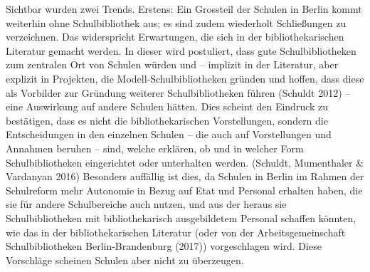 \documentclass[a4paper,
fontsize=11pt,
oneside,
numbers=noperiodatend,
parskip=half-,
bibliography=totoc,
final
]{scrartcl}
\begin{document}
Sichtbar wurden zwei Trends. Erstens: Ein Grossteil der Schulen in
Berlin kommt weiterhin ohne Schulbibliothek aus; es sind zudem
wiederholt Schließungen zu verzeichnen. Das widerspricht Erwartungen,
die sich in der bibliothekarischen Literatur gemacht werden. In dieser
wird postuliert, dass gute Schulbibliotheken zum zentralen Ort von
Schulen würden und -- implizit in der Literatur, aber explizit in
Projekten, die Modell-Schulbibliotheken gründen und hoffen, dass diese
als Vorbilder zur Gründung weiterer Schulbibliotheken führen (Schuldt
2012) -- eine Auswirkung auf andere Schulen hätten. Dies scheint den
Eindruck zu bestätigen, dass es nicht die bibliothekarischen
Vorstellungen, sondern die Entscheidungen in den einzelnen Schulen --
die auch auf Vorstellungen und Annahmen beruhen -- sind, welche
erklären, ob und in welcher Form Schulbibliotheken eingerichtet oder
unterhalten werden. (Schuldt, Mumenthaler \& Vardanyan 2016) Besonders
auffällig ist dies, da Schulen in Berlin im Rahmen der Schulreform mehr
Autonomie in Bezug auf Etat und Personal erhalten haben, die sie für
andere Schulbereiche auch nutzen, und aus der heraus sie
Schulbibliotheken mit bibliothekarisch ausgebildetem Personal schaffen
könnten, wie das in der bibliothekarischen Literatur (oder von der
Arbeitsgemeinschaft Schulbibliotheken Berlin-Brandenburg (2017))
vorgeschlagen wird. Diese Vorschläge scheinen Schulen aber nicht zu
überzeugen.
\end{document}
